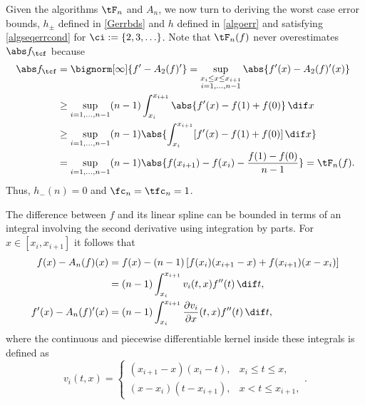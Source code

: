Given the algorithms $\tF_n$ and $A_n$, we now turn to deriving the worst case error bounds, $h_{\pm}$ defined in \eqref{Gerrbds} and $h$ defined in \eqref{algoerr} and satisfying \eqref{algseqerrcond} for $\ci:=\{2, 3, \ldots\}$.
Note that $\tF_{n}(f)$ never overestimates $\Ftnorm{f}$ because
\begin{align*}
\Ftnorm{f} &  = \bignorm[\infty]{f'-A_2(f)'}
= \sup_{\substack{x_i \le x \le x_{i+1}\\ i=1, \ldots, n-1 }} \abs{f'(x) - A_2(f)'(x)} \\
&\ge \sup_{i=1, \ldots, n-1} (n-1)\int_{x_i}^{x_{i+1}} \abs{f'(x) - f(1)+f(0)} \, \dif x \\
&\ge \sup_{i=1, \ldots, n-1} (n-1)\abs{\int_{x_i}^{x_{i+1}} [f'(x) - f(1)+f(0)] \, \dif x }\\
&= \sup_{i=1, \ldots, n-1} (n-1)\abs{f(x_{i+1})-f(x_i) - \frac{f(1)-f(0)}{n-1}} = \tF_n(f).
\end{align*}
Thus, $h_{-}(n)=0$ and $\fc_n=\tfc_n=1$.

The difference between $f$ and its linear spline can be bounded in terms of an integral involving the second derivative using integration by parts.  For $x \in [x_i,x_{i+1}]$ it follows that
\begin{align}
\nonumber
f(x)-A_n (f)(x)
&= f(x) - (n-1) \left[f(x_{i})(x_{i+1}-x) +f(x_{i+1})(x-x_i) \right]\\
& = (n-1) \int_{x_i}^{x_{i+1}} v_i(t,x) f''(t) \, \dif t, \label{fintermsfdoubprime}\\
f'(x)-A_n(f)'(x) & = (n-1) \int_{x_i}^{x_{i+1}} \frac{\partial v_i}{\partial x}(t,x) f''(t) \, \dif t, \label{fprimeintermsfdoubprime}
\end{align}
where the continuous and piecewise differentiable kernel inside these integrals is defined as
\begin{equation*}
v_i(t,x) =\begin{cases} (x_{i+1}-x)(x_i-t), & x_i\leq t\leq x,\\
(x-x_{i})(t- x_{i+1}), & x< t \leq x_{i+1},
\end{cases}.
\end{equation*}

